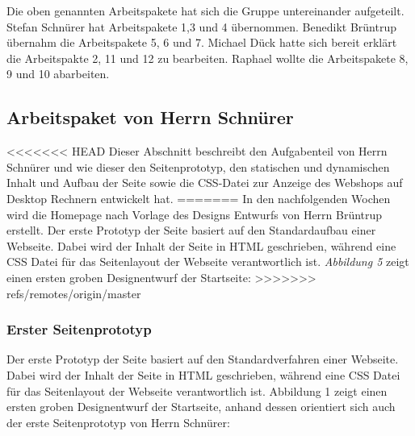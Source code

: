 Die oben genannten Arbeitspakete hat sich die Gruppe untereinander aufgeteilt. Stefan Schnürer hat Arbeitspakete 1,3 und 4 übernommen. Benedikt Brüntrup übernahm die Arbeitspakete 5, 6 und 7. Michael Dück hatte sich bereit erklärt die Arbeitspakte 2, 11 und 12 zu bearbeiten. Raphael wollte die Arbeitspakete 8, 9 und 10 abarbeiten.



\newpage
\subsection{Arbeitspaket von Herrn Schnürer}

<<<<<<< HEAD
Dieser Abschnitt beschreibt den Aufgabenteil von Herrn Schnürer und wie dieser den Seitenprototyp, den statischen und dynamischen Inhalt und Aufbau der Seite sowie die CSS-Datei zur Anzeige des Webshops auf Desktop Rechnern entwickelt hat.
=======
In den nachfolgenden Wochen wird die Homepage nach Vorlage des Designs Entwurfs von Herrn Brüntrup erstellt. Der erste Prototyp der Seite basiert auf den Standardaufbau einer Webseite. Dabei wird der Inhalt der Seite in HTML geschrieben, während eine CSS Datei für das Seitenlayout der Webseite verantwortlich ist. \textit{Abbildung 5} zeigt einen ersten groben Designentwurf der Startseite:
>>>>>>> refs/remotes/origin/master

\subsubsection{Erster Seitenprototyp}

Der erste Prototyp der Seite basiert auf den Standardverfahren einer Webseite. Dabei wird der Inhalt der Seite in HTML geschrieben, während eine CSS Datei für das Seitenlayout der Webseite verantwortlich ist. Abbildung 1 zeigt einen ersten groben Designentwurf der Startseite, anhand dessen orientiert sich auch der erste Seitenprototyp von Herrn Schnürer:

